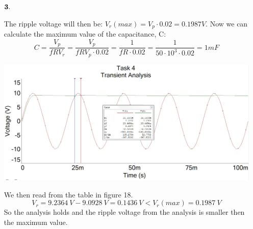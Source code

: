 \documentclass[11pt,a4paper]{article}
\begin{document}
\begin{enumerate}
  \item[$\bold{3.}$]
  
  	The ripple voltage will then be: $V_r(max) = V_p \cdot 0.02 = 0.1987 V$. Now we can calculate the maximum value of the capacitance, C: $$ C = \dfrac{V_p}{f R V_r} = \dfrac{V_p}{f R V_p \cdot 0.02} = \dfrac{1}{f R \cdot 0.02} = \dfrac{1}{50 \cdot 10^3 \cdot 0.02} = 1mF $$
  	
  	\begin{minipage}{\linewidth}
    	\centering
        \includegraphics[width=15cm]{4_4.jpg}
    \end{minipage}
    \vspace{1em}
    
    We then read from the table in figure 18. $$ V_r = 9.2364 \: V- 9.0928\: V = 0.1436\: V < V_r(max) = 0.1987\: V$$ 
    So the analysis holds and the ripple voltage from the analysis is smaller then the maximum value.
  
\end{enumerate}

  
\end{document}
